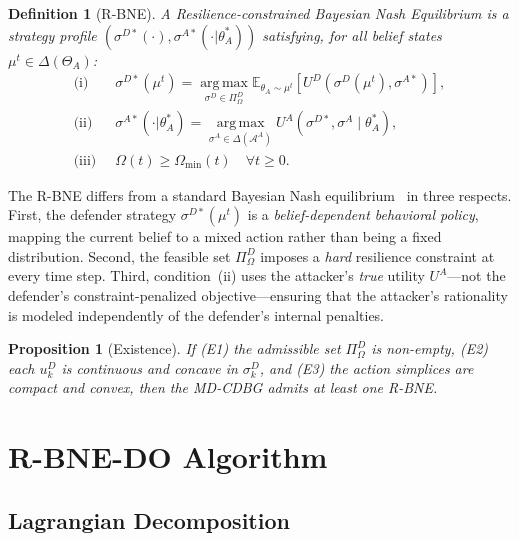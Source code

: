\documentclass[conference]{IEEEtran}
\newtheorem{definition}{Definition}
\newtheorem{proposition}{Proposition}
\newcommand{\E}{\mathbb{E}}
\newcommand{\argmax}{\operatorname*{arg\,max}}
\begin{document}
\begin{definition}[R-BNE]\label{def:rbne}
A \emph{Resilience-constrained Bayesian Nash Equilibrium} is a strategy profile
$(\sigma^{D*}(\cdot),\sigma^{A*}(\cdot|\theta_A^*))$ satisfying, for all belief
states $\mu^t\in\Delta(\Theta_A)$:
\begin{align}
\text{(i)}\;\; &\sigma^{D*}(\mu^t) = \argmax_{\sigma^D\in\Pi^D_\Omega}
\E_{\theta_A\sim\mu^t}\!\left[U^D(\sigma^D(\mu^t),\sigma^{A*})\right],\\
\text{(ii)}\;\; &\sigma^{A*}(\cdot|\theta_A^*) =
\argmax_{\sigma^A\in\Delta(\mathcal{A}^A)}
U^A(\sigma^{D*},\sigma^A\mid\theta_A^*),\\
\text{(iii)}\;\; &\Omega(t)\geq\Omega_{\min}(t)\quad\forall t\geq 0.
\end{align}
\end{definition}

The R-BNE differs from a standard Bayesian Nash equilibrium~\cite{nash1951} in
three respects.
First, the defender strategy $\sigma^{D*}(\mu^t)$ is a \emph{belief-dependent
behavioral policy}, mapping the current belief to a mixed action rather than
being a fixed distribution. Second, the feasible set $\Pi^D_\Omega$ imposes a
\emph{hard} resilience constraint at every time step. Third, condition~(ii) uses
the attacker's \emph{true} utility $U^A$---not the defender's
constraint-penalized objective---ensuring that the attacker's rationality is
modeled independently of the defender's internal penalties.

\begin{proposition}[Existence]
\label{prop:existence}
If (E1) the admissible set $\Pi^D_\Omega$ is non-empty, (E2) each $u_k^D$ is
continuous and concave in $\sigma_k^D$, and (E3) the action simplices are
compact and convex, then the MD-CDBG admits at least one R-BNE.
\end{proposition}

\section{R-BNE-DO Algorithm}
\label{sec:algo}

\subsection{Lagrangian Decomposition}
\end{document}
